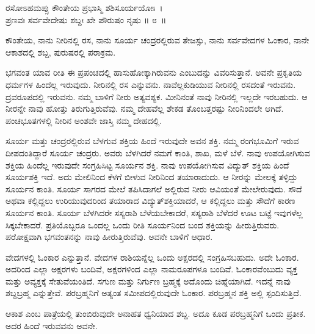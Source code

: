 \begin{shloka}
ರಸೋಽಹಮಪ್ಸು ಕೌಂತೇಯ ಪ್ರಭಾಸ್ಮಿ ಶಶಿಸೂರ್ಯಯೋಃ~।\\ಪ್ರಣವಃ ಸರ್ವವೇದೇಷು ಶಬ್ದಃ ಖೇ ಪೌರುಷಂ ನೃಷು \hfill॥ ೮~॥
\end{shloka}

\begin{artha}
ಕೌಂತೇಯ, ನಾನು ನೀರಿನಲ್ಲಿ ರಸ, ನಾನು ಸೂರ್ಯ ಚಂದ್ರರಲ್ಲಿರುವ ತೇಜಸ್ಸು, ನಾನು ಸರ್ವವೇದಗಳ ಓಂಕಾರ, ನಾನೇ ಆಕಾಶದಲ್ಲಿ ಶಬ್ದ, ಪುರುಷರಲ್ಲಿ ಪರಾಕ್ರಮ.
\end{artha}

ಭಗವಂತ ಯಾವ ರೀತಿ ಈ ಪ್ರಪಂಚದಲ್ಲಿ ಹಾಸುಹೋಕ್ಕಾಗಿರುವನು ಎಂಬುದನ್ನು ವಿವರಿಸುತ್ತಾನೆ. ಅವನೇ ಪ್ರಕೃತಿಯ ಧರ್ಮಗಳ ಹಿಂದೆಲ್ಲ ಇರುವುದು. ನೀರಿನಲ್ಲಿ ರಸ ಎನ್ನುವನು. ನಾವೆಲ್ಲಕುಡಿಯುವ ನೀರಿನಲ್ಲಿ ರಸದಂತೆ ಇರುವನು. ದ್ರವರೂಪದಲ್ಲಿ ಇರುವನು. ನಮ್ಮ ಬಾಳಿಗೆ ನೀರು ಅತ್ಯವಶ್ಯಕ. ಮೀನಿನಂತೆ ನಾವು ನೀರಿನಲ್ಲಿ ಇಲ್ಲದೇ ಇರಬಹುದು. ಆ ನೀರನ್ನೇ ನಾವು ಹೋತ್ತು ತಿರುಗುತ್ತಿರುವೆವು. ನಮ್ಮ ದೇಹವೆಲ್ಲ ಶೇಕಡ ತೊಂಬತ್ತರಷ್ಟು ನೀರಿನಿಂದಲೇ ಆಗಿದೆ. ಪಂಚಭೂತಗಳಲ್ಲಿ ನೀರಿನ ಅಂಶವೇ ಜಾಸ್ತಿ ನಮ್ಮ ದೇಹದಲ್ಲಿ.

ಸೂರ್ಯ ಮತ್ತು ಚಂದ್ರರಲ್ಲಿರುವ ಬೆಳಗುವ ಶಕ್ತಿಯ ಹಿಂದೆ ಇರುವುದೇ ಅವನ ಶಕ್ತಿ. ನಮ್ಮ ರಂಗಭೂಮಿಗೆ ಇರುವ ದೀಪದಂತಿದ್ದಾರೆ ಸೂರ್ಯ ಚಂದ್ರರು. ಅವರು ಬೆಳಗಿದರೆ ನಮಗೆ ಕಾಂತಿ, ಶಾಖ, ಮಳೆ ಬೆಳೆ. ನಾವು ಉಪಯೋಗಿಸುವ ಶಕ್ತಿಯ ಹಿಂದೆಲ್ಲ ಇರುವುದೇ ಸಂಗ್ರಹಿಸಿಟ್ಟ ಸೂರ್ಯನ ಶಕ್ತಿ. ನಾವು ಉಪಯೋಗಿಸುವ ವಿದ್ಯುತ್ ಶಕ್ತಿಯ ಹಿಂದೆ ಸೂರ್ಯಶಕ್ತಿ ಇದೆ. ಅದು ಮೇಲಿನಿಂದ ಕೆಳಗೆ ಬೀಳುವ ನೀರಿನಿಂದ ತಯಾರಾದುದು. ಆ ನೀರನ್ನು ಮೇಲಕ್ಕೆ ತಳ್ಳಿದ್ದು ಸೂರ್ಯನ ಕಾಂತಿ. ಸೂರ್ಯ ಸಾಗರದ ಮೇಲೆ ತಪಿಸಿದಾಗಲೆ ಅಲ್ಲಿರುವ ನೀರು ಆವಿಯಂತೆ ಮೇಲೇರುವುದು. ಸೌದೆ ಅಥವಾ ಕಲ್ಲಿದ್ದಲು ಉರಿಯುವುದರಿಂದ ತಯಾರಾದ ವಿದ್ಯುತ್​ಶಕ್ತಿಯಾದರೆ, ಆ ಕಲ್ಲಿದ್ದಲು ಮತ್ತು ಸೌದೆಗೆ ಕಾರಣ ಸೂರ್ಯನ ಕಾಂತಿ. ಸೂರ್ಯ ಬೆಳಗಿದರೇ ಸಸ್ಯರಾಶಿ ಬೆಳೆಯಬೇಕಾದರೆ, ಸಸ್ಯರಾಶಿ ಬೆಳೆದರೆ ಊಟ ಬಟ್ಟೆ ಇವುಗಳೆಲ್ಲ ಸಿಕ್ಕಬೇಕಾ\-ದರೆ. ಪ್ರತಿಯೊಬ್ಬರೂ ಒಂದಲ್ಲ ಒಂದು ರೀತಿ ಸೂರ್ಯನಿಂದ ಬಂದ ಶಕ್ತಿಯನ್ನು ಹೀರುತ್ತಿರುವರು. ಪರೋಕ್ಷವಾಗಿ ಭಗವಂತನನ್ನು ನಾವು ಹೀರುತ್ತಿರುವೆವು. ಅವನೇ ಬಾಳಿಗೆ ಆಧಾರ.

ವೇದಗಳಲ್ಲಿ ಓಂಕಾರ ಎನ್ನುತ್ತಾನೆ. ವೇದಗಳ ರಾಶಿಯನ್ನೆಲ್ಲ ಒಂದು ಅಕ್ಷರದಲ್ಲಿ ಸಂಗ್ರಹಿಸ\-ಬಹುದು. ಅದೇ ಓಂಕಾರ. ಅದರಿಂದ ಎಲ್ಲಾ ಅಕ್ಷರಗಳು ಬಂದಿವೆ, ಅಕ್ಷರಗಳಿಂದ ಎಲ್ಲಾ ನಾಮರೂಪಗಳೂ ಬಂದಿವೆ. ಓಂಕಾರವೆಂಬುದು ವ್ಯಕ್ತ ಮತ್ತು ಅವ್ಯಕ್ತಕ್ಕೆ ಸೇತುವೆಯಂತಿದೆ. ಸಗುಣ ಮತ್ತು ನಿರ್ಗುಣ ಬ್ರಹ್ಮಕ್ಕೆ ಅದೊಂದು ಚಿಹ್ನೆಯಾಗಿದೆ. ಇದನ್ನೆ ನಾವು ಶಬ್ದಬ್ರಹ್ಮ ಎನ್ನುತ್ತೇವೆ. ಪರಬ್ರಹ್ಮನಿಗೆ ಅತ್ಯಂತ ಸಮೀಪದಲ್ಲಿರುವುದೇ ಓಂಕಾರ. ಪರಬ್ರಹ್ಮನ ಶಕ್ತಿ ಅಲ್ಲಿ ಸ್ಪಂದಿಸುತ್ತಿದೆ.

ಆಕಾಶ ಎಂಬ ಪಾತ್ರೆಯಲ್ಲಿ ತುಂಬಿರುವುದೇ ಅನಾಹತ ಧ್ವನಿಯಾದ ಶಬ್ದ. ಅದೂ ಕೂಡ ಪರಬ್ರಹ್ಮನಿಗೆ ಒಂದು ಪ್ರತೀಕ. ಅದರ ಹಿಂದೆ ಇರುವವನು ಅವನೇ.

